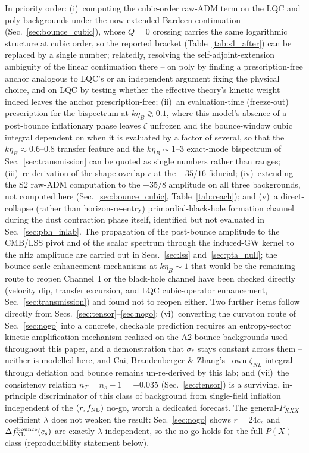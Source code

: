 \documentclass[aps,prd,twocolumn,superscriptaddress,nofootinbib,longbibliography]{revtex4-2}
\newcommand{\fnl}{f_{\rm NL}}
\begin{document}
In priority order: (i)~computing the cubic-order raw-ADM term on the LQC
and poly backgrounds under the now-extended Bardeen continuation
(Sec.~\ref{sec:bounce_cubic}), whose $Q=0$ crossing carries the same
logarithmic structure at cubic order, so the reported bracket
(Table~\ref{tab:s1_after}) can be replaced by a single number; relatedly,
resolving the self-adjoint-extension ambiguity of the linear continuation
there -- on poly by finding a prescription-free anchor analogous to
LQC's or an independent argument fixing the physical choice, and on LQC
by testing whether the effective theory's kinetic weight indeed leaves
the anchor prescription-free;
(ii)~an evaluation-time (freeze-out) prescription for the bispectrum at
$k\eta_B\gtrsim0.1$, where this model's absence of a post-bounce
inflationary phase leaves $\zeta$ unfrozen and the bounce-window cubic
integral dependent on when it is evaluated by a factor of several, so that
the $k\eta_B\approx0.6$--$0.8$ transfer feature and the $k\eta_B\sim1$--$3$
exact-mode bispectrum of Sec.~\ref{sec:transmission} can be quoted as
single numbers rather than ranges; (iii)~re-derivation of the shape
overlap $r$ at the $-35/16$ fiducial; (iv)~extending the S2 raw-ADM
computation to the $-35/8$ amplitude on all three backgrounds, not
computed here (Sec.~\ref{sec:bounce_cubic}, Table~\ref{tab:reach}); and
(v)~a direct-collapse (rather than
horizon-re-entry) primordial-black-hole formation channel during the dust
contraction phase itself, identified but not evaluated in
Sec.~\ref{sec:pbh_inlab}. The propagation of the post-bounce amplitude to
the CMB/LSS pivot and of the scalar spectrum through the induced-GW kernel
to the nHz amplitude are carried
out in Secs.~\ref{sec:lss} and~\ref{sec:pta_null}; the bounce-scale
enhancement mechanisms at $k\eta_B\sim1$ that would be the remaining route
to reopen Channel~I or the black-hole channel have been checked directly
(velocity dip, transfer excursion, and LQC
cubic-operator enhancement, Sec.~\ref{sec:transmission}) and found not to
reopen either. Two further items follow directly from
Secs.~\ref{sec:tensor}--\ref{sec:nogo}: (vi)~converting the curvaton route
of Sec.~\ref{sec:nogo} into a concrete, checkable prediction requires an
entropy-sector kinetic-amplification mechanism realized on the A2 bounce
backgrounds used throughout this paper, and a demonstration that
$\sigma_*$ stays constant across them -- neither is modelled here, and
Cai, Brandenberger \& Zhang's~\cite{CaiXue2011} own $\zeta_{NL}$ integral
through deflation and bounce remains un-re-derived by this lab; and
(vii)~the consistency relation $n_T=n_s-1=-0.035$
(Sec.~\ref{sec:tensor}) is a surviving, in-principle discriminator of this
class of background from single-field inflation independent of the
$(r,\fnl)$ no-go, worth a dedicated forecast. The general-$P_{XXX}$
coefficient $\lambda$ does not weaken the result: Sec.~\ref{sec:nogo}
shows $r=24c_s$ and $\Delta\fnl^{\rm bounce}(c_s)$ are exactly
$\lambda$-independent, so the no-go holds for the full $P(X)$ class
(reproducibility statement below).
\end{document}
